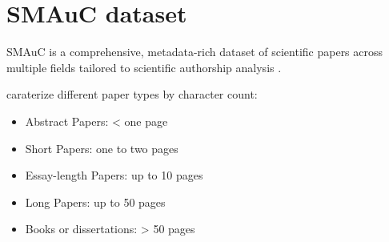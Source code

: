 \section{SMAuC dataset}
\label{sec:smauc_dataset}

SMAuC is a comprehensive, metadata-rich dataset of scientific papers across multiple fields tailored to scientific authorship analysis \cite{bevendorff_smauc_2023}.

\citet{bevendorff_smauc_2023} caraterize different paper types by character count:
\begin{itemize}
    \item Abstract Papers: < one page
    \item Short Papers: one to two pages
    \item Essay-length Papers: up to 10 pages
    \item Long Papers: up to 50 pages
    \item Books or dissertations: > 50 pages
\end{itemize}